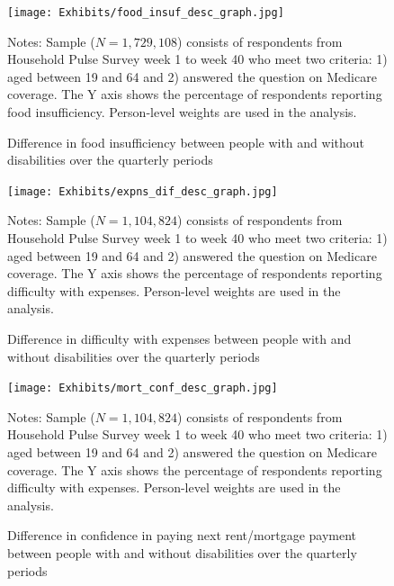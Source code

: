 \documentclass[12pt]{article}
\begin{document}
\begin{figure}[h!]\label{food_insuf_desc}
\caption{Difference in food insufficiency between people with and without disabilities over the quarterly periods}
\centering
\texttt{[image: Exhibits/food\_insuf\_desc\_graph.jpg]}
\medskip 
\begin{minipage}{0.8\textwidth} 
{\footnotesize Notes: Sample ($N=1,729,108$) consists of respondents from Household Pulse Survey week 1 to week 40 who meet two criteria: 1) aged between 19 and 64 and 2) answered the question on Medicare coverage. The Y axis shows the percentage of respondents reporting food insufficiency. Person-level weights are used in the analysis. \par}
\end{minipage}
\end{figure}

\begin{figure}[h!]\label{expns_dif_desc}
\caption{Difference in difficulty with expenses between people with and without disabilities over the quarterly periods}
\centering
\texttt{[image: Exhibits/expns\_dif\_desc\_graph.jpg]}
\medskip 
\begin{minipage}{0.8\textwidth} 
{\footnotesize Notes: Sample ($N=1,104,824$) consists of respondents from Household Pulse Survey week 1 to week 40 who meet two criteria: 1) aged between 19 and 64 and 2) answered the question on Medicare coverage. The Y axis shows the percentage of respondents reporting difficulty with expenses. Person-level weights are used in the analysis. \par}
\end{minipage}
\end{figure}

\begin{figure}[h!]\label{mort_conf_desc}
\caption{Difference in confidence in paying next rent/mortgage payment between people with and without disabilities over the quarterly periods}
\centering
\texttt{[image: Exhibits/mort\_conf\_desc\_graph.jpg]}
\medskip 
\begin{minipage}{0.8\textwidth} 
{\footnotesize Notes: Sample ($N=1,104,824$) consists of respondents from Household Pulse Survey week 1 to week 40 who meet two criteria: 1) aged between 19 and 64 and 2) answered the question on Medicare coverage. The Y axis shows the percentage of respondents reporting difficulty with expenses. Person-level weights are used in the analysis. \par}
\end{minipage}
\end{figure}
\end{document}
